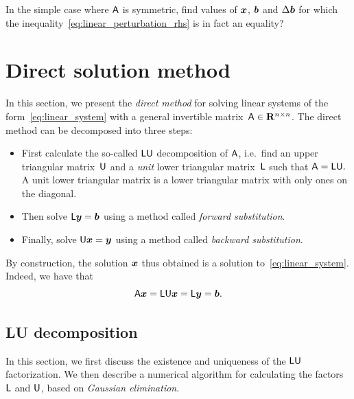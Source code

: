 \begin{exercise}
    \label{exercise:linear_sharp_inequality}
    In the simple case where $\mathsf A$ is symmetric,
    find values of $\mathbf{\boldsymbol{x}}$, $\mathbf{\boldsymbol{b}}$ and $\Delta \mathbf{\boldsymbol{b}}$ for which the inequality~\eqref{eq:linear_perturbation_rhs} is in fact an equality?
\end{exercise}

\section{Direct solution method}%
\label{sec:direct_solution_method}
In this section,
we present the \emph{direct method} for solving linear systems of the form~\eqref{eq:linear_system}
with a general invertible matrix~$\mathsf A \in \mathbf R^{n \times n}$.
The direct method can be decomposed into three steps:
\begin{itemize}
    \item
        First calculate the so-called $\mathsf L \mathsf U$ decomposition of $\mathsf A$,
        i.e.\ find an upper triangular matrix~$\mathsf U$ and a \emph{unit} lower triangular matrix~$\mathsf L$ such that
        \(
            \mathsf A = \mathsf L \mathsf U.
        \)
        A unit lower triangular matrix is a lower triangular matrix with only ones on the diagonal.

    \item
        Then solve
        \(
            \mathsf L \mathbf{\boldsymbol{y}} = \mathbf{\boldsymbol{b}}
        \)
         using a method called \emph{forward substitution}.

    \item
        Finally, solve
        \(
            \mathsf U \mathbf{\boldsymbol{x}} = \mathbf{\boldsymbol{y}}
        \)
         using a method called \emph{backward substitution}.
\end{itemize}
By construction, the solution $\mathbf{\boldsymbol{x}}$ thus obtained is a solution to~\eqref{eq:linear_system}.
Indeed, we have that
\[
    \mathsf A \mathbf{\boldsymbol{x}} = \mathsf L \mathsf U \mathbf{\boldsymbol{x}} = \mathsf L \mathbf{\boldsymbol{y}} = \mathbf{\boldsymbol{b}}.
\]

\subsection{LU decomposition}%
\label{sub:lu_decomposition}

In this section,
we first discuss the existence and uniqueness of the $\mathsf L \mathsf U$ factorization.
We then describe a numerical algorithm for calculating the factors $\mathsf L$ and $\mathsf U$,
based on \emph{Gaussian elimination}.

